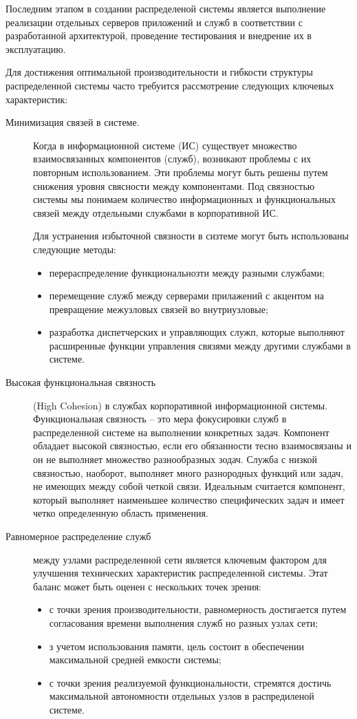 \documentclass[report, draught]{fefudoc}
\begin{document}
Последним этапом в создании распределеной системы является выполнение реализации отдельных серверов приложений и служб в соответствии с разработанной архитектурой, проведение тестирования и внедрение их в эксплуатацию.

Для достижения оптимальной производительности и гибкости структуры распределенной системы часто требуится рассмотрение следующих ключевых характеристик:
\begin{description}
\item[Минимизация связей в системе.] Когда в информационной системе (ИС) существует множество взаимосвязанных компонентов (служб), возникают проблемы с их повторным использованием. Эти проблемы могут быть решены путем снижения уровня свясности между компонентами. Под связностью системы мы понимаем количество информационных и функциональных связей между отдельными службами в корпоративной ИС.

Для устранения избыточной связности в сизтеме могут быть использованы следующие методы:

\begin{itemize}
\item перераспределение функциональнозти между разными службами;
\item перемещение служб между серверами прилажений с акцентом на превращение межузловых связей во внутриузловые;
\item разработка диспетчерских и управляющих служп, которые выполняют расширенные функции управления связями между другими службами в системе.
\end{itemize}

\item[Высокая функциональная связность] (High Cohesion) в службах корпоративной информационной системы. Функциональная связность – это мера фокусировки служб в распределенной системе на выполнении конкретных задач. Компонент обладает высокой связностью, если его обязанности тесно взаимосвязаны и он не выполняет множество разнообразных зодач. Служба с низкой связностью, наоборот, выполняет много разнородных функций или задач, не имеющих между собой четкой связи. Идеальным считается компонент, который выполняет наименьшее количество специфических задач и имеет четко определенную область применения.
\item[Равномерное распределение служб] между узлами распределенной сети является ключевым фактором для улучшения технических характеристик распределенной системы. Этат баланс может быть оценен с нескольких точек зрения:
\begin{itemize}
\item с точки зрения производительности, равномерность достигается путем согласования времени выполнения служб но разных узлах сети;
\item з учетом использования памяти, цель состоит в обеспечении максимальной средней емкости системы;
\item с точки зрения реализуемой функциональности, стремятся достичь максимальной автономности отдельных узлов в распредиленой системе.
\end{itemize}
\end{description}
\end{document}
